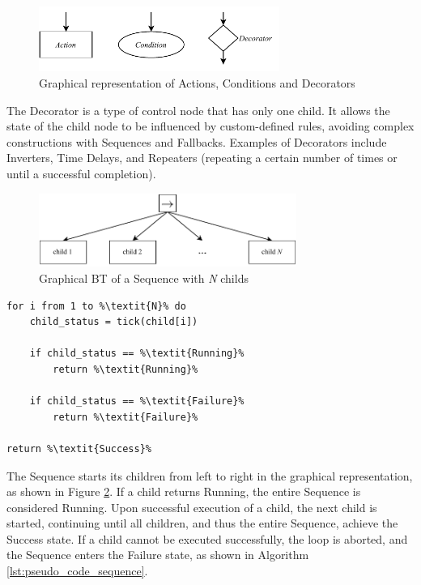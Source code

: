 \begin{figure}[h]
    \centering
    \includegraphics[width=0.7\textwidth]{figures/02_state_of_the_art/bt_types.pdf}
    \caption{Graphical representation of Actions, Conditions and Decorators}
    \label{fig:bt_types}
\end{figure}

The Decorator is a type of control node that has only one child. It allows the state of the child node to be influenced by custom-defined rules, avoiding complex constructions with Sequences and Fallbacks. Examples of Decorators include Inverters, Time Delays, and Repeaters (repeating a certain number of times or until a successful completion).

\begin{figure}[h]
    \centering
    \includegraphics[width=0.75\textwidth]{figures/02_state_of_the_art/sequence.pdf}
    \caption{Graphical BT of a Sequence with \textit{N} childs}
    \label{fig:sequence}
\end{figure}

\begin{lstlisting}[float=h]
for i from 1 to %\textit{N}% do
    child_status = tick(child[i])
    
    if child_status == %\textit{Running}%
        return %\textit{Running}%
        
    if child_status == %\textit{Failure}%
        return %\textit{Failure}%

return %\textit{Success}%
\end{lstlisting}

The Sequence starts its children from left to right in the graphical representation, as shown in Figure \ref{fig:sequence}. If a child returns Running, the entire Sequence is considered Running. Upon successful execution of a child, the next child is started, continuing until all children, and thus the entire Sequence, achieve the Success state. If a child cannot be executed successfully, the loop is aborted, and the Sequence enters the Failure state, as shown in Algorithm \ref{lst:pseudo_code_sequence}.
  

